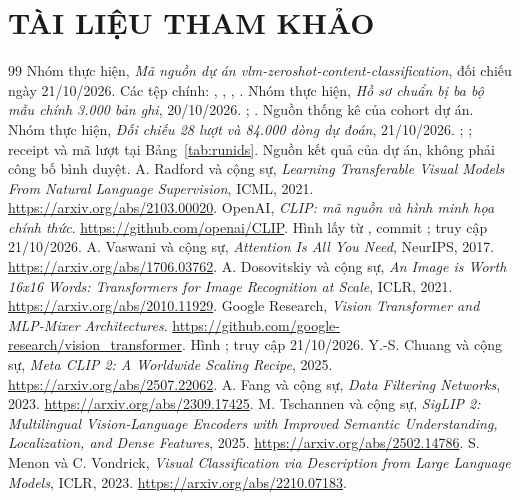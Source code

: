 \documentclass[12pt,a4paper]{article}
\newcommand{\sectioncenter}[1]{%
  \titleformat{\section}{\centering\fontsize{16pt}{20pt}\bfseries}{\thesection}{1em}{}%
  \section*{#1}%
  \titleformat{\section}{\fontsize{16pt}{20pt}\bfseries}{\thesection}{1em}{}}
\begin{document}
\newpage
\sectioncenter{TÀI LIỆU THAM KHẢO}
\begingroup\renewcommand{\section}[2]{}
\begin{thebibliography}{99}
 Nhóm thực hiện, \textit{Mã nguồn dự án vlm-zeroshot-content-classification}, đối chiếu ngày 21/10/2026. Các tệp chính: , , , .
 Nhóm thực hiện, \textit{Hồ sơ chuẩn bị ba bộ mẫu chính 3.000 bản ghi}, 20/10/2026. ; . Nguồn thống kê của cohort dự án.
 Nhóm thực hiện, \textit{Đối chiếu 28 lượt và 84.000 dòng dự đoán}, 21/10/2026. ; ; receipt và mã lượt tại Bảng~\ref{tab:runids}. Nguồn kết quả của dự án, không phải công bố bình duyệt.
 A. Radford và cộng sự, \textit{Learning Transferable Visual Models From Natural Language Supervision}, ICML, 2021. \url{https://arxiv.org/abs/2103.00020}.
 OpenAI, \textit{CLIP: mã nguồn và hình minh họa chính thức}. \url{https://github.com/openai/CLIP}. Hình lấy từ , commit ; truy cập 21/10/2026.
 A. Vaswani và cộng sự, \textit{Attention Is All You Need}, NeurIPS, 2017. \url{https://arxiv.org/abs/1706.03762}.
 A. Dosovitskiy và cộng sự, \textit{An Image is Worth 16x16 Words: Transformers for Image Recognition at Scale}, ICLR, 2021. \url{https://arxiv.org/abs/2010.11929}.
 Google Research, \textit{Vision Transformer and MLP-Mixer Architectures}. \url{https://github.com/google-research/vision_transformer}. Hình ; truy cập 21/10/2026.
 Y.-S. Chuang và cộng sự, \textit{Meta CLIP 2: A Worldwide Scaling Recipe}, 2025. \url{https://arxiv.org/abs/2507.22062}.
 A. Fang và cộng sự, \textit{Data Filtering Networks}, 2023. \url{https://arxiv.org/abs/2309.17425}.
 M. Tschannen và cộng sự, \textit{SigLIP 2: Multilingual Vision-Language Encoders with Improved Semantic Understanding, Localization, and Dense Features}, 2025. \url{https://arxiv.org/abs/2502.14786}.
 S. Menon và C. Vondrick, \textit{Visual Classification via Description from Large Language Models}, ICLR, 2023. \url{https://arxiv.org/abs/2210.07183}.

\end{thebibliography}
\end{document}
